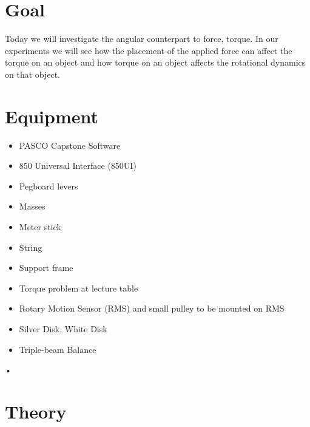 \documentclass[main.tex]{subfiles}
\begin{document}
\section*{Goal}
Today we will investigate the angular counterpart to force, torque. In our experiments we will see how the placement of the applied force can affect the torque on an object and how torque on an object affects the rotational dynamics on that object.

\section*{Equipment}
\begin{itemize}
\item
PASCO Capstone Software
\item
850 Universal Interface (850UI)
\item
Pegboard levers
\item
Masses
\item
Meter stick
\item
String
\item
Support frame
\item
Torque problem at lecture table
\item
Rotary Motion Sensor (RMS) and small pulley to be mounted on RMS
\item
Silver Disk, White Disk
\item
Triple-beam Balance
\end{itemize}•

\section*{Theory}

\begin{figure}
\centering
{}
\caption{} \label{fig:Torque}
\end{figure} \vspace{-10pt}
\end{document}
